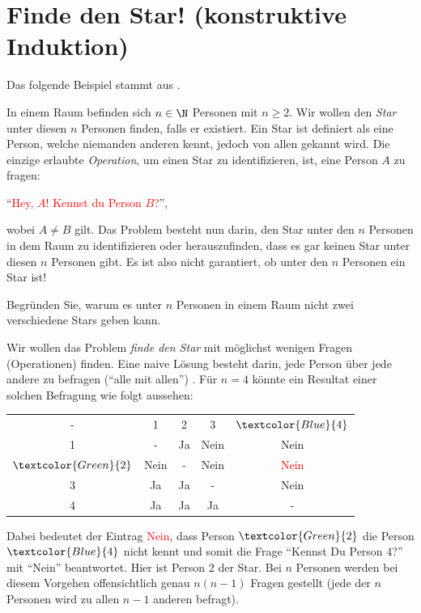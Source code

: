 \section{Finde den Star! (konstruktive Induktion)}
Das folgende Beispiel stammt aus \cite{Datenstrukturen}.

\begin{mydefinition}\label{mydefinition:star}
In einem Raum befinden sich $n\in\N$ Personen mit $n\geq 2$. Wir wollen den \emph{Star} unter diesen $n$ Personen finden, falls er existiert. Ein Star ist definiert als eine Person, welche niemanden anderen kennt, jedoch von allen gekannt wird. Die einzige erlaubte \emph{Operation}, um einen Star zu identifizieren, ist, eine Person $A$ zu fragen:
\begin{center}
    \enquote{\textcolor{Red}{Hey, $A$! Kennst du Person $B$?}},
\end{center}
wobei $A\neq B$ gilt. Das Problem  besteht nun darin, den Star unter den $n$ Personen in dem Raum zu identifizieren oder herauszufinden, dass es gar keinen Star unter diesen $n$ Personen gibt. Es ist also nicht garantiert, ob unter den $n$ Personen ein Star ist!
\end{mydefinition}

\begin{myexercise}\label{myexercise:0350}
    Begründen Sie, warum es unter $n$ Personen in einem Raum nicht zwei verschiedene Stars geben kann.
\end{myexercise}
\noindent
Wir wollen das Problem \textit{finde den Star} mit möglichst wenigen Fragen (Operationen) finden. Eine naive Lösung besteht darin, jede Person über jede andere zu befragen (\enquote{alle mit allen})
. Für $n=4$ könnte ein Resultat einer solchen Befragung wie folgt aussehen:
\begin{table}[H]
\centering
    \begin{tabular}{ccccc}
    -                                        & 1    & 2  & 3    & $\textcolor{Blue}{4}$   \\
    1                                       & -    & Ja & Nein & Nein                                     \\
    $\textcolor{Green}{2}$ & Nein & -  & Nein & \textcolor{Red}{Nein} \\
    3                                       & Ja   & Ja & -    & Nein                                     \\
    4                                       & Ja   & Ja & Ja   & -                                       
    \end{tabular}
\end{table}
\noindent
Dabei bedeutet der Eintrag \textcolor{Red}{Nein}, dass Person $\textcolor{Green}{2}$ die Person $\textcolor{Blue}{4}$ nicht kennt und somit die Frage \enquote{Kennst Du Person 4?} mit \enquote{Nein} beantwortet. Hier ist Person 2 der Star. Bei $n$ Personen werden bei diesem Vorgehen offensichtlich genau $n(n-1)$ Fragen gestellt (jede der $n$ Personen wird zu allen $n-1$ anderen befragt).

